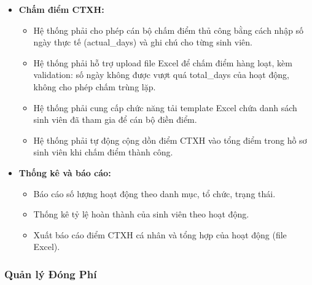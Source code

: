 \begin{itemize}
    \item \textbf{Chấm điểm CTXH:}
    \begin{itemize}
        \item Hệ thống phải cho phép cán bộ chấm điểm thủ công bằng cách nhập số ngày thực tế (actual\_days) và ghi chú cho từng sinh viên.
        \item Hệ thống phải hỗ trợ upload file Excel để chấm điểm hàng loạt, kèm validation: số ngày không được vượt quá total\_days của hoạt động, không cho phép chấm trùng lặp.
        \item Hệ thống phải cung cấp chức năng tải template Excel chứa danh sách sinh viên đã tham gia để cán bộ điền điểm.
        \item Hệ thống phải tự động cộng dồn điểm CTXH vào tổng điểm trong hồ sơ sinh viên khi chấm điểm thành công.
    \end{itemize}
    
    \item \textbf{Thống kê và báo cáo:}
    \begin{itemize}
        \item Báo cáo số lượng hoạt động theo danh mục, tổ chức, trạng thái.
        \item Thống kê tỷ lệ hoàn thành của sinh viên theo hoạt động.
        \item Xuất báo cáo điểm CTXH cá nhân và tổng hợp của hoạt động (file Excel).
    \end{itemize}
\end{itemize}

\subsubsection{Quản lý Đóng Phí}

